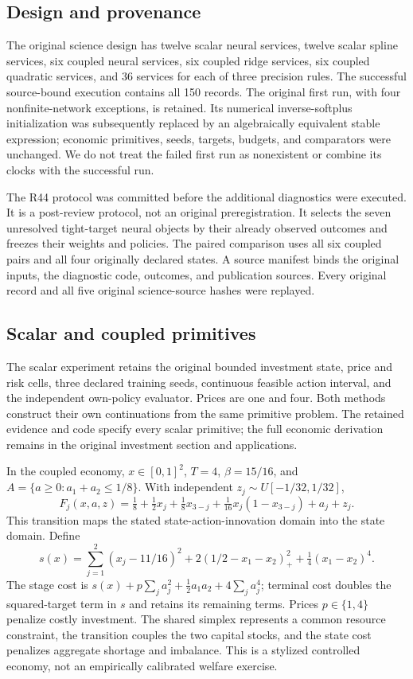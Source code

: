 \documentclass[ecta,nameyear,draft]{econsocart}
\begin{document}
\subsection{Design and provenance}
The original science design has twelve scalar neural services, twelve scalar spline services, six coupled neural services, six coupled ridge services, six coupled quadratic services, and 36 services for each of three precision rules. The successful source-bound execution contains all 150 records. The original first run, with four nonfinite-network exceptions, is retained. Its numerical inverse-softplus initialization was subsequently replaced by an algebraically equivalent stable expression; economic primitives, seeds, targets, budgets, and comparators were unchanged. We do not treat the failed first run as nonexistent or combine its clocks with the successful run.

The R44 protocol was committed before the additional diagnostics were executed. It is a post-review protocol, not an original preregistration. It selects the seven unresolved tight-target neural objects by their already observed outcomes and freezes their weights and policies. The paired comparison uses all six coupled pairs and all four originally declared states. A source manifest binds the original inputs, the diagnostic code, outcomes, and publication sources. Every original record and all five original science-source hashes were replayed.

\subsection{Scalar and coupled primitives}
The scalar experiment retains the original bounded investment state, price and risk cells, three declared training seeds, continuous feasible action interval, and the independent own-policy evaluator. Prices are one and four. Both methods construct their own continuations from the same primitive problem. The retained evidence and code specify every scalar primitive; the full economic derivation remains in the original investment section and applications.

In the coupled economy, $x\in[0,1]^2$, $T=4$, $\beta=15/16$, and
$A=\{a\geq0:a_1+a_2\leq1/8\}$. With independent $z_j\sim U[-1/32,1/32]$,
\[
 F_j(x,a,z)=\tfrac18+\tfrac12x_j+\tfrac18x_{3-j}
           +\tfrac1{16}x_j(1-x_{3-j})+a_j+z_j.
\]
This transition maps the stated state-action-innovation domain into the state domain. Define
\[
 s(x)=\sum_{j=1}^2(x_j-11/16)^2
       +2(1/2-x_1-x_2)_+^2+\tfrac14(x_1-x_2)^4.
\]
The stage cost is $s(x)+p\sum_ja_j^2+\tfrac12a_1a_2+4\sum_ja_j^4$; terminal cost doubles the squared-target term in $s$ and retains its remaining terms. Prices $p\in\{1,4\}$ penalize costly investment. The shared simplex represents a common resource constraint, the transition couples the two capital stocks, and the state cost penalizes aggregate shortage and imbalance. This is a stylized controlled economy, not an empirically calibrated welfare exercise.
\end{document}

